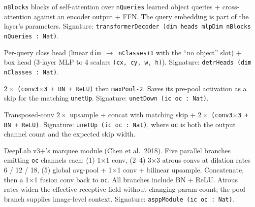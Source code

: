 \begin{definition}
  \label{layer:transformerDecoder}
  \leanok
  \texttt{nBlocks} blocks of self-attention over
  \texttt{nQueries} learned object queries + cross-attention against an
  encoder output + FFN. The query embedding is part of the layer's
  parameters. Signature:
  \texttt{transformerDecoder (dim heads mlpDim nBlocks nQueries : Nat)}.
\end{definition}

\begin{definition}
  \label{layer:detrHeads}
  \leanok
  Per-query class head (linear \texttt{dim $\to$ nClasses+1} with the
  ``no object'' slot) + box head (3-layer MLP to 4 scalars
  \texttt{(cx, cy, w, h)}). Signature: \texttt{detrHeads (dim nClasses : Nat)}.
\end{definition}

\begin{definition}
  \label{layer:unetDown}
  \leanok
  $2 \times$ \texttt{(conv3$\times$3 + BN + ReLU)} then \texttt{maxPool-2}.
  Saves its pre-pool activation as a skip for the matching
  \texttt{unetUp}. Signature: \texttt{unetDown (ic oc : Nat)}.
\end{definition}

\begin{definition}
  \label{layer:unetUp}
  \leanok
  Transposed-conv $2\times$ upsample + concat with matching skip +
  $2 \times$ \texttt{(conv3$\times$3 + BN + ReLU)}. Signature:
  \texttt{unetUp (ic oc : Nat)}, where \texttt{oc} is both the output
  channel count and the expected skip width.
\end{definition}

\begin{definition}
  \label{layer:asppModule}
  \leanok
  DeepLab v3+'s marquee module (Chen et al.\ 2018). Five parallel
  branches emitting \texttt{oc} channels each: (1) 1$\times$1 conv, (2--4)
  3$\times$3 atrous convs at dilation rates 6 / 12 / 18, (5) global avg-pool
  + 1$\times$1 conv + bilinear upsample. Concatenate, then a 1$\times$1
  fusion conv back to \texttt{oc}. All branches include BN + ReLU.
  Atrous rates widen the effective receptive field without changing
  param count; the pool branch supplies image-level context. Signature:
  \texttt{asppModule (ic oc : Nat)}.
\end{definition}

